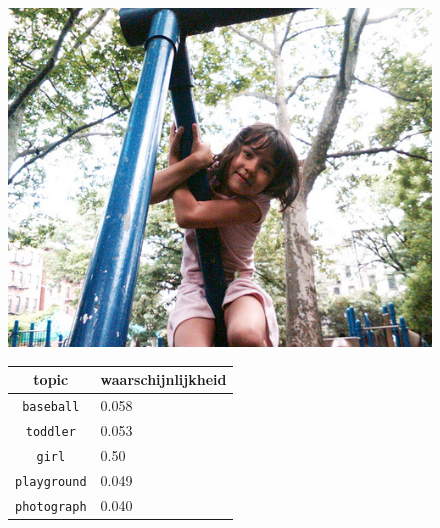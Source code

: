 \begin{figure}[!htb]
    \centering
    \begin{minipage}[t]{.5\linewidth}
    \centering
    \vspace{0pt}
    \includegraphics[width=\textwidth]{Images/LDA/3643021980.jpg}
    \end{minipage}\hfill
    \begin{minipage}[t]{.5\textwidth}
    \centering
    \vspace{0pt}
    \begin{tabular}{cl}
            topic                           & waarschijnlijkheid\\
            \hline
            \texttt{baseball}             & 0.058 \\
            \texttt{toddler}                   & 0.053 \\
            \texttt{girl}                 & 0.50 \\
            \texttt{playground}           & 0.049 \\
            \texttt{photograph}        & 0.040\\
            \hline
        \end{tabular}
    \end{minipage}
\end{figure}

